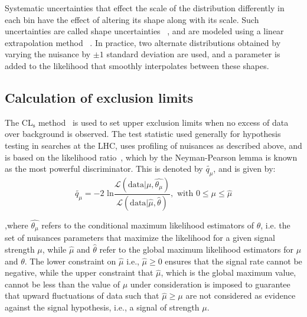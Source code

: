 Systematic uncertainties that effect the scale of the distribution differently in each bin have the effect of altering its shape along with its scale. Such uncertainties are called shape uncertainties ~\cite{shape_syst1}, and are modeled using a linear extrapolation method ~\cite{shape_syst2}. In practice, two alternate distributions obtained by varying the nuisance by $\pm 1$ standard deviation are used, and a parameter is added to the likelihood that smoothly interpolates between these shapes.

\subsection{Calculation of exclusion limits}
\label{exc_cal}
The CL$_\text{s}$ method~\cite{cls1,cls2,cls3} is used to set upper exclusion limits when no excess of data over background is observed. The test statistic used generally for hypothesis testing in searches at the LHC, uses profiling of nuisances as described above, and is based on the likelihood ratio~\cite{prof_likelihood}, which by the Neyman-Pearson lemma is known as the most powerful discriminator. This is denoted by $\tilde{q_\mu}$, and is given by:
\begin{equation}
\label{eq:proflik}
  \tilde{q_\mu}=-2\text{ ln}\frac{\mathcal{L}(\text{data}|\mu,\hat{\theta_\mu})}{\mathcal{L}(\text{data}|\hat{\mu},\hat{\theta})},\text{   with  } 0\leq \mu \leq \hat{\mu} 
\end{equation}

,where $\hat{\theta_\mu}$ refers to the conditional maximum likelihood estimators of $\theta$, i.e. the set of nuisances parameters that maximize the likelihood for a given signal strength $\mu$, while $\hat\mu$ and $\hat\theta$ refer to the global maximum likelihood estimators for $\mu$ and $\theta$. The lower constraint on $\hat{\mu}$ i.e., $\hat{\mu}\geq 0$ ensures that the signal rate cannot be negative, while the upper constraint that $\hat{\mu}$, which is the global maximum value, cannot be less than the value of $\mu$ under consideration is imposed to guarantee that upward fluctuations of data such that $\hat{\mu}\geq \mu$ are not considered as evidence against the signal hypothesis, i.e., a signal of strength $\mu$.

